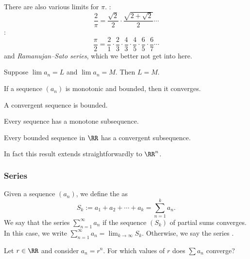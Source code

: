 \begin{remark}
There are also various limits for $\pi$. :
\[ \frac{2}{\pi} = \frac{\sqrt{2}}{2} \cdot \frac{\sqrt{2+\sqrt{2}}}{2} \cdots \]
:
\[ \frac{\pi}{2} = \frac{2}{1} \cdot \frac{2}{3} \cdot \frac{4}{3} \cdot \frac{4}{5} \cdot \frac{6}{5} \cdot \frac{6}{7} \cdots \]
and \emph{Ramanujan--Sato series}, which we better not get into here.
\end{remark}

\begin{theorem}
Suppose $\lim a_n = L$ and $\lim a_n = M$. Then $L = M$.
\end{theorem}

\begin{theorem}
If a sequence $(a_n)$ is monotonic and bounded, then it converges.
\end{theorem}

\begin{remark}
A convergent sequence is bounded.
\end{remark}

\begin{lemma}
Every sequence has a monotone subsequence.
\end{lemma}

\begin{theorem}
Every bounded sequence in $\RR$ has a convergent subsequence.
\end{theorem}

In fact this result extends straightforwardly to $\RR^n$.

\subsubsection{Series}

\begin{definition}
Given a sequence $(a_n)$, we define the  as
\[ S_k := a_1 + a_2 + \cdots + a_k = \sum_{n=1}^k a_n. \]
We say that the series $\sum_{n=1}^\infty a_n$  if the sequence $(S_k)$ of partial sums converges. In this case, we write $\sum_{n=1}^\infty a_n = \lim_{k \to \infty} S_k$. Otherwise, we say the series .
\end{definition}

\begin{example}
Let $r \in \RR$ and consider $a_n = r^n$. For which values of $r$ does $\sum a_n$ converge?
\end{example}

